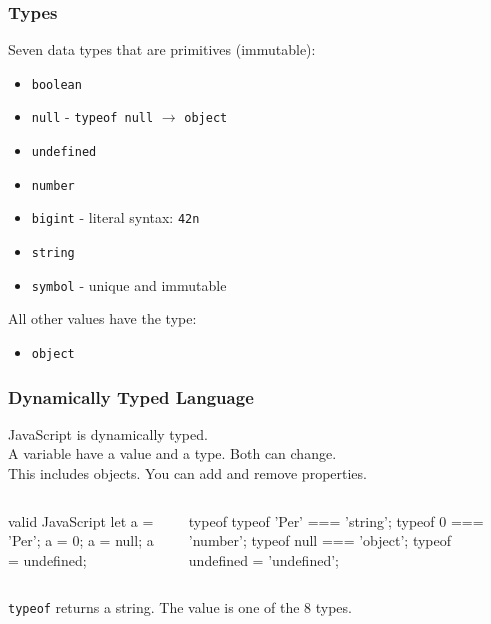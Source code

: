 \begin{frame}[fragile]
  \frametitle{Types}
Seven data types that are primitives (immutable):
\begin{itemize}
  \item  \verb|boolean|
  \item  \verb|null| - \verb|typeof null| $\rightarrow$ \verb|object|
  \item  \verb|undefined|
  \item  \verb|number|
  \item  \verb|bigint| - literal syntax: \verb|42n|
  \item  \verb|string|
  \item  \verb|symbol| - unique and immutable
\end{itemize}
All other values have the type:
\begin{itemize}
  \item  \verb|object|
\end{itemize}
\end{frame}

\begin{frame}[fragile]
  \frametitle{Dynamically Typed Language}
  JavaScript is dynamically typed.\\
  A variable have a value and a type. Both can change.\\
  This includes objects. You can add and remove properties.\\
  \vspace{5mm}
  \begin{columns}[onlytextwidth]
    \begin{column}{0.4\textwidth}
      \begin{CodeBox}{ valid JavaScript}
let a = 'Per';  
a = 0;
a = null;
a = undefined;
      \end{CodeBox}
    \end{column}
  \begin{column}{0.55\textwidth}
    \begin{CodeBox}{typeof}
typeof 'Per' === 'string';
typeof 0 === 'number';
typeof null === 'object';
typeof undefined = 'undefined';
      \end{CodeBox}
    \end{column}
    \begin{column}{0.3\textwidth}  \end{column}
  \end{columns}%
  \vspace{5mm}
\verb|typeof| returns a string. The value is one of the 8 types.
\end{frame}

